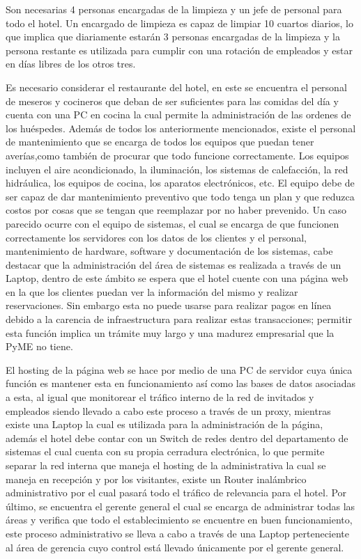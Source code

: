 \documentclass[10pt]{article}
\begin{document}
Son necesarias 4 personas encargadas de la limpieza y un jefe de personal para todo el hotel. Un encargado de limpieza es capaz de limpiar 10 cuartos diarios, lo que implica que diariamente estarán 3 personas encargadas de la limpieza y la persona restante es utilizada para cumplir con una rotación de empleados y estar en días libres de los otros tres. 

Es necesario considerar el restaurante del hotel, en este se encuentra el personal de meseros y cocineros que deban de ser suficientes para las comidas del día y cuenta con una PC en cocina la cual permite la administración de las ordenes de los huéspedes. Además de todos los anteriormente mencionados, existe el personal de mantenimiento que se encarga de todos los equipos que puedan tener averías,como también de procurar que todo funcione correctamente. Los equipos incluyen el aire acondicionado, la iluminación, los sistemas de calefacción, la red hidráulica, los equipos de cocina, los aparatos electrónicos, etc. El equipo debe de ser capaz de dar mantenimiento preventivo que todo tenga un plan y que reduzca costos por cosas que se tengan que reemplazar por no haber prevenido. Un caso parecido ocurre con el equipo de sistemas, el cual se encarga de que funcionen correctamente los servidores con los datos de los clientes y el personal, mantenimiento de hardware, software y documentación de los sistemas, cabe destacar que la administración del área de sistemas es realizada a través de un Laptop, dentro de este ámbito se espera que el hotel cuente con una página web en la que los clientes puedan ver la información del mismo y realizar reservaciones. Sin embargo esta no puede usarse para realizar pagos en línea debido a la carencia de infraestructura para realizar estas transacciones; permitir esta función implica un trámite muy largo y una madurez empresarial que la PyME no tiene. 


El hosting de la página web se hace por medio de una PC de servidor cuya única función es mantener esta en funcionamiento así como las bases de datos asociadas a esta, al igual que monitorear el tráfico interno de la red de invitados y empleados siendo llevado a cabo este proceso a través de un proxy, mientras existe una Laptop la cual es utilizada para la administración de la página, además el hotel debe contar con un Switch de redes dentro del departamento de sistemas el cual cuenta con su propia cerradura electrónica, lo que permite separar la red interna que maneja el hosting de la administrativa la cual se maneja en recepción y por los visitantes, existe un Router inalámbrico administrativo por el cual pasará todo el tráfico de relevancia para el hotel. Por último, se encuentra el gerente general el cual se encarga de administrar todas las áreas y verifica que todo el establecimiento se encuentre en buen funcionamiento, este proceso administrativo se lleva a cabo a través de una Laptop perteneciente al área de gerencia cuyo control está llevado únicamente por el gerente general. 
\end{document}
